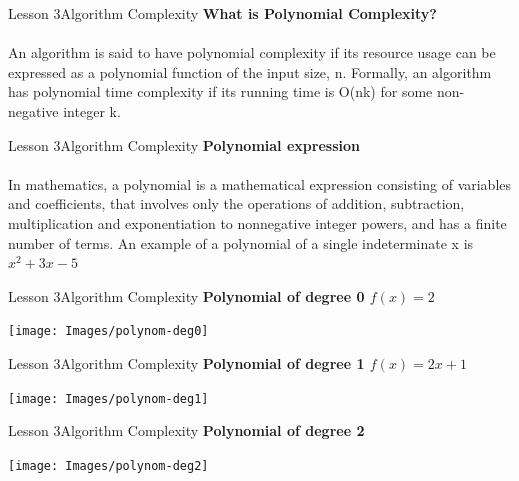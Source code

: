\documentclass[aspectratio=1610]{beamer}
\begin{document}
\begin{frame}{Lesson 3}{Algorithm Complexity}
\LARGE
\textbf{What is Polynomial Complexity?}\\~\\
An algorithm is said to have polynomial complexity if its resource usage can be
expressed as a polynomial function of the input size, n. Formally, an algorithm
has polynomial time complexity if its running time is O(nk) for some non-negative
integer k.
\end{frame}


\begin{frame}{Lesson 3}{Algorithm Complexity}
\LARGE
\textbf{Polynomial expression}\\~\\
\Large
In mathematics, a polynomial is a mathematical expression consisting of variables
and coefficients, that involves only the operations of addition, subtraction,
multiplication and exponentiation to nonnegative integer powers, and has a finite
number of terms. An example of a polynomial of a single indeterminate x is 
\(x^2 + 3x - 5\)
\end{frame}


\begin{frame}{Lesson 3}{Algorithm Complexity}
\LARGE
\textbf{Polynomial of degree 0 \(f(x)=2\)}\\
\begin{center}
\texttt{[image: Images/polynom-deg0]}
\end{center}
\end{frame}



\begin{frame}{Lesson 3}{Algorithm Complexity}
\LARGE
\textbf{Polynomial of degree 1 \(f(x) = 2x + 1\)}\\
\begin{center}
\texttt{[image: Images/polynom-deg1]}
\end{center}
\end{frame}


\begin{frame}{Lesson 3}{Algorithm Complexity}
\LARGE
\textbf{Polynomial of degree 2 }\\
\begin{center}
\texttt{[image: Images/polynom-deg2]}
\end{center}
\end{frame}
\end{document}
